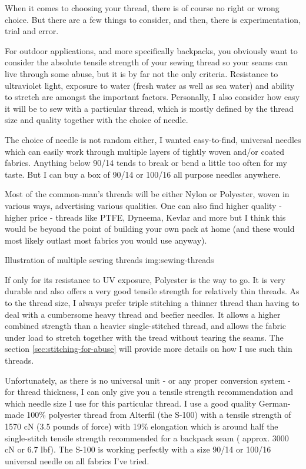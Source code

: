 When it comes to choosing your thread, there is of course no right or wrong choice. But there are a few things to consider, and then, there is experimentation, trial and error.

For outdoor applications, and more specifically backpacks, you obviously want to consider the absolute tensile strength of your sewing thread so your seams can live through some abuse, but it is by far not the only criteria. Resistance to ultraviolet light, exposure to water (fresh water as well as sea water) and ability to stretch are amongst the important factors. Personally, I also consider how easy it will be to sew with a particular thread, which is mostly defined by the thread size and quality together with the choice of needle.

\begin{note}
  The choice of needle is not random either, I wanted easy-to-find, universal needles which can easily work through multiple layers of tightly woven and/or coated fabrics. Anything below 90/14 tends to break or bend a little too often for my taste. But I can buy a box of 90/14 or 100/16 all purpose needles anywhere.
\end{note}

Most of the common-man's threads will be either Nylon or Polyester, woven in various ways, advertising various qualities. One can also find higher quality - higher price - threads like PTFE, Dyneema, Kevlar and more but I think this would be beyond the point of building your own pack at home (and these would most likely outlast most fabrics you would use anyway).

{Illustration of multiple sewing threads}
{img:sewing-threads}

If only for its resistance to UV exposure, Polyester is the way to go. It is very durable and also offers a very good tensile strength for relatively thin threads. As to the thread size, I always prefer triple stitching a thinner thread than having to deal with a cumbersome heavy thread and beefier needles. It allows a higher combined strength than a heavier single-stitched thread, and allows the fabric under load to stretch together with the tread without tearing the seams. The section \ref{sec:stitching-for-abuse} will provide more details on how I use such thin threads.

Unfortunately, as there is no universal unit - or any proper conversion system - for thread thickness, I can only give you a tensile strength recommendation and which needle size I use for this particular thread. I use a good quality German-made 100\% polyester thread from Alterfil (the S-100) with a tensile strength of 1570 cN (3.5 pounds of force) with 19\% elongation which is around half the single-stitch tensile strength recommended for a backpack seam ( approx. 3000 cN or 6.7 lbf). The S-100 is working perfectly with a size 90/14 or 100/16 universal needle on all fabrics I've tried.

